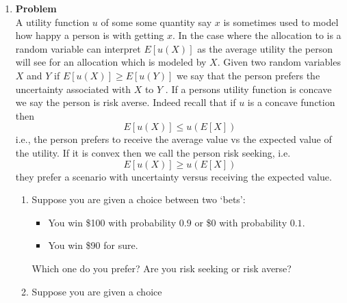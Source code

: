 \documentclass[12pt]{article}
\newenvironment{Ex}{\textbf{Problem}\vspace{.75em}\\}{}
\begin{document}
\begin{enumerate}
\begin{Ex}
\begin{solution}
\begin{enumerate}
          Which leads to
          \begin{equation}
            \label{eq:7c-sol}
            \begin{aligned}
              & g(p_1 + p_2)\cdot\left(\frac{p_1}{p_1 + p_2}x_1 +
                \frac{p_2}{p_1 + p_2}x_2 + p_3 \cdot x_3\right) \\
              \ge \quad & (p_1 + p_2)\cdot g\left(\frac{p_1}{p_1 +
                  p_2}x_1 + \frac{p_2}{p_1 + p_2}x_2\right) + p_3
              \cdot g(x_3) \\
            \end{aligned}
          \end{equation}
          And corresponds to \cref{eq:convex-prob}.
        \end{enumerate}
      \end{solution}
    \end{Ex}
  \item
    \begin{Ex}
      A utility function $u$ of some some quantity say $x$ is sometimes
      used to model how happy a person is with getting $x$. In the case
      where the allocation to is a random variable can interpret
      $E[u(X)]$ as the average utility the person will see for an
      allocation which is modeled by $X$. Given two random variables $X$
      and $Y$ if $E [u(X)] \ge E [u(Y)]$ we say that the person prefers
      the uncertainty associated with $X$ to $Y$ . If a persons utility
      function is concave we say the person is risk averse. Indeed
      recall that if $u$ is a concave function then
      $$ E[u(X)] \le u(E[X]) $$
      i.e., the person prefers to receive the average value vs the
      expected value of the utility. If it is convex then we call the
      person risk seeking, i.e.
      $$ E[u(X)] \ge u(E[X]) $$
      they prefer a scenario with uncertainty versus receiving the expected value.
      \begin{enumerate}
      \item Suppose you are given a choice between two `bets':
        \begin{itemize}
        \item You win \$100 with probability $0.9$ or \$0 with
          probability $0.1$.
        \item You win \$90 for sure.
        \end{itemize}
        Which one do you prefer? Are you risk
        seeking or risk averse?
      \item Suppose you are given a choice

\end{enumerate}
\end{Ex}
\end{enumerate}
\end{document}
